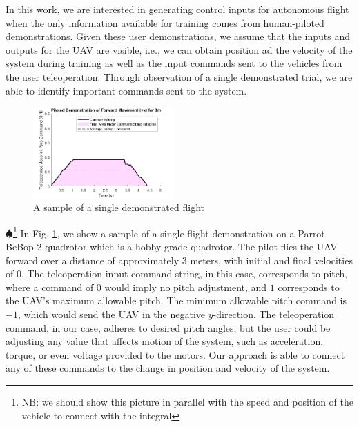 \documentclass[letterpaper, 10 pt, conference]{ieeeconf}  %
\newcommand\NB[1]{$\spadesuit$\footnote{NB: #1}}
\begin{document}
In this work, we are interested in generating control inputs for autonomous flight when the only information available for training comes from human-piloted demonstrations. Given these user demonstrations, we assume that the inputs and outputs for the UAV are visible, i.e., we can obtain position ad the velocity of the system during training as well as the input commands sent to the vehicles from the user teleoperation. 
Through observation of a single demonstrated trial, we are able to identify important commands sent to the system. 

\begin{figure}[ht]
    \includegraphics[width=0.48\textwidth]{images/sampleintegral.png}
    \caption{A sample of a single demonstrated flight}
    \label{fig:sampleintegral}
\end{figure}
\NB{we should show this picture in parallel with the speed and position of the vehicle to connect with the integral}
In Fig. \ref{fig:sampleintegral}, we show a sample of a single flight demonstration on a Parrot BeBop 2 quadrotor which is a hobby-grade quadrotor. The pilot flies the UAV forward over a distance of approximately $3$ meters, with initial and final velocities of $0$. The teleoperation input command string, in this case, corresponds to pitch, where a command of $0$ would imply no pitch adjustment, and $1$ corresponds to the UAV's maximum allowable pitch. The minimum allowable pitch command is $-1$, which would send the UAV in the negative $y$-direction. The teleoperation command, in our case, adheres to desired pitch angles, but the user could be adjusting any value that affects motion of the system, such as acceleration, torque, or even voltage provided to the motors. Our approach is able to connect any of these commands to the change in position  and velocity of the system.
\end{document}
